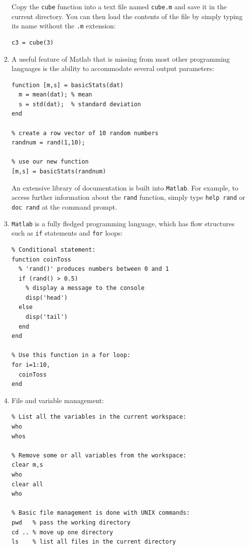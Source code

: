 \documentclass{book}
\begin{document}
\begin{enumerate}
Copy the \texttt{cube} function into a text file named \texttt{cube.m}
and save it in the current directory. You can then load the contents
of the file by simply typing its name without the \texttt{.m}
extension:

\begin{verbatim}
c3 = cube(3)
\end{verbatim}

\item A useful feature of Matlab that is missing from most other
  programming languages is the ability to accommodate several output
  parameters:

\begin{verbatim}
function [m,s] = basicStats(dat)
  m = mean(dat); % mean
  s = std(dat);  % standard deviation
end

% create a row vector of 10 random numbers
randnum = rand(1,10);

% use our new function
[m,s] = basicStats(randnum)
\end{verbatim}

An extensive library of documentation is built into \texttt{Matlab}.
For example, to access further information about the \texttt{rand}
function, simply type \texttt{help rand} or \texttt{doc rand} at the
command prompt.

\item\texttt{Matlab} is a fully fledged programming language, which
  has flow structures such as \texttt{if} statements and \texttt{for}
  loops:

\begin{verbatim}
% Conditional statement:
function coinToss
  % 'rand()' produces numbers between 0 and 1
  if (rand() > 0.5)
    % display a message to the console
    disp('head')
  else
    disp('tail')
  end
end

% Use this function in a for loop:
for i=1:10,
  coinToss
end
\end{verbatim}

\item File and variable management:

\begin{verbatim}
% List all the variables in the current workspace:
who
whos

% Remove some or all variables from the workspace:
clear m,s
who
clear all
who

% Basic file management is done with UNIX commands:
pwd   % pass the working directory
cd .. % move up one directory
ls    % list all files in the current directory
\end{verbatim}


\end{enumerate}
\end{document}

